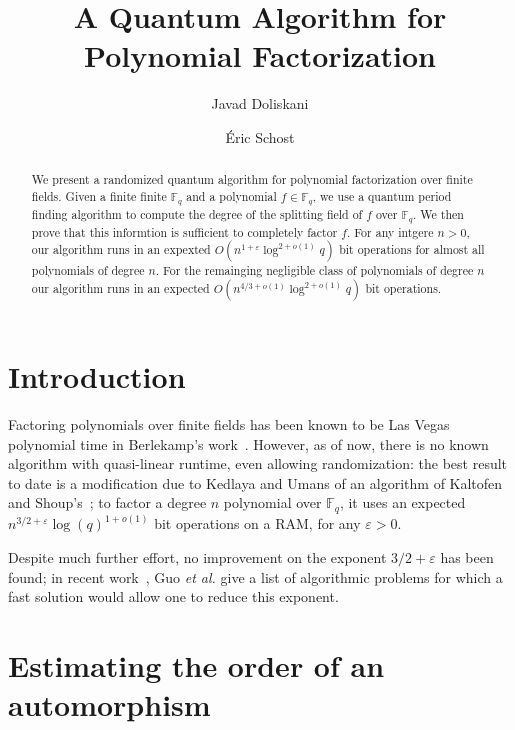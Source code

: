 \documentclass[12pt]{article}
\title{A Quantum Algorithm for Polynomial Factorization}
\author[1]{Javad Doliskani}
\affil[1]{\small Institute for Quantum Computing, University of Waterloo}
\author[2]{\'Eric Schost}
\affil[2]{\small Cheriton School of Computer Science, University of Waterloo}
\date{}
\theoremstyle{plain}
\theoremstyle{definition}
\def\F{\ensuremath{\mathbb{F}}}
\begin{document}
\maketitle

\begin{abstract}
We present a randomized quantum algorithm for polynomial factorization over finite fields. 
Given a finite finite $\mathbb{F}_q$ and a polynomial $f \in \mathbb{F}_q$, we use a quantum 
period finding algorithm to compute the degree of the splitting field of $f$ over 
$\mathbb{F}_q$. We then prove that this informtion is sufficient to completely factor $f$. For 
any intgere $n > 0$, our algorithm runs in an expexted $O(n^{1 + \varepsilon} \log^{2 + o(1)}q)$ bit 
operations for almost all polynomials of degree $n$. For the remainging negligible class of 
polynomials of degree $n$ our algorithm runs in an expected $O(n^{4 / 3 + o(1)} \log^{2 + 
o(1)}q)$ bit operations.
\end{abstract}



\section{Introduction}

Factoring polynomials over finite fields has been known to be Las
Vegas polynomial time in Berlekamp's work~\cite{Berlekamp70}. However,
as of now, there is no known algorithm with quasi-linear runtime, even
allowing randomization: the best result to date is a modification due
to Kedlaya and Umans of an algorithm of Kaltofen and
Shoup's~\cite{KaSh98,kedlaya2011fast}; to factor a degree $n$ polynomial
over $\F_q$, it uses an expected $n^{3/2+\varepsilon}
\log(q)^{1+o(1)}$ bit operations on a RAM, for any $\varepsilon > 0$.

Despite much further effort, no improvement on the exponent
${3/2+\varepsilon}$ has been found; in recent
work~\cite{guo_et_al:LIPIcs:2016:6460}, Guo {\it et al.} give a list
of algorithmic problems for which a fast solution would allow one to
reduce this exponent.





\section{Estimating the order of an automorphism}
\label{sec:ord-frob}
\end{document}
